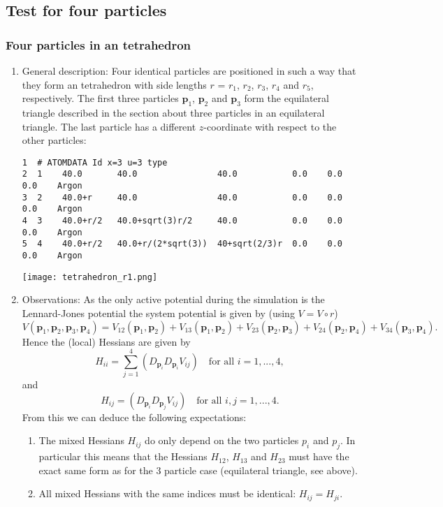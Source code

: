 \documentclass[a4paper]{article}
\newcommand{\boldp}{\boldsymbol{p}}
\begin{document}
\subsection{Test for four particles}
\label{sec-1-6}
\subsubsection{Four particles in an tetrahedron}
\label{sec-1-6-1}
\begin{enumerate}
\item General description:
\label{sec-1-6-1-1}
Four identical particles are positioned in such a way that they form an tetrahedron with side lengths \(r\) = \(r_1\), \(r_2\), \(r_3\), \(r_4\) and \(r_5\), respectively.
The first three particles \(\boldp_1\), \(\boldp_2\) and \(\boldp_3\) form the equilateral triangle described in the section about three particles in an equilateral triangle.
The last particle has a different \(z\)-coordinate with respect to the other particles:
\begin{verbatim}
1  # ATOMDATA Id x=3 u=3 type
2  1    40.0       40.0                40.0           0.0    0.0    0.0    Argon
3  2    40.0+r     40.0                40.0           0.0    0.0    0.0    Argon
4  3    40.0+r/2   40.0+sqrt(3)r/2     40.0           0.0    0.0    0.0    Argon
5  4    40.0+r/2   40.0+r/(2*sqrt(3))  40+sqrt(2/3)r  0.0    0.0    0.0    Argon
\end{verbatim}
\texttt{[image: tetrahedron\_r1.png]}
\item Observations:
\label{sec-1-6-1-2}
As the only active potential during the simulation is the Lennard-Jones potential the system potential is given by (using \(V = V\circ r\))
\[
V(\boldp_1, \boldp_2, \boldp_3, \boldp_4) = V_{12}(\boldp_1, \boldp_2) + V_{13}(\boldp_1, \boldp_2) + V_{23}(\boldp_2, \boldp_3) + V_{24}(\boldp_2, \boldp_4) + V_{34}(\boldp_3, \boldp_4).
\]
Hence the (local) Hessians are given by
\[
H_{ii} = \sum_{j=1}^4 (D_{\boldp_i} D_{\boldp_i} V_{ij}) \quad \text{for all } i = 1, ..., 4,
\]
and
\[
H_{ij} = (D_{\boldp_i} D_{\boldp_j} V_{ij}) \quad \text{for all } i, j = 1, ..., 4.
\]
From this we can deduce the following expectations:
\begin{enumerate}
\item The mixed Hessians \(H_{ij}\) do only depend on the two particles \(p_i\) and \(p_j\). In particular this means that the Hessians \(H_{12}\), \(H_{13}\) and \(H_{23}\) must have the exact same form as for the 3 particle case (equilateral triangle, see above).
\item All mixed Hessians with the same indices must be identical: \(H_{ij} = H_{ji}\).

\end{enumerate}
\end{enumerate}
\end{document}
